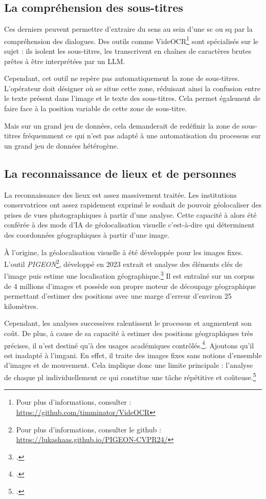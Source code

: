 \subsection{La compréhension des sous-titres}

Ces derniers peuvent permettre d'extraire du sens au sein d'une \gls{sc} ou \gls{sq} par la compréhension des dialogues. Des outils comme VideOCR\footnote{Pour plus d'informations, consulter : \url{https://github.com/timminator/VideOCR}} sont spécialisés sur le sujet : ils isolent les sous-titres, les transcrivent en chaînes de caractères brutes prêtes à être interprétées par un \gls{LLM}.

Cependant, cet outil ne repère pas automatiquement la zone de sous-titres. L'opérateur doit désigner où se situe cette zone, réduisant ainsi la confusion entre le texte présent dans l'image et le texte des sous-titres. Cela permet également de faire face à la position variable de cette zone de sous-titre.

Mais sur un grand jeu de données, cela demanderait de redéfinir la zone de sous-titres fréquemment ce qui n'est pas adapté à une automatisation du processus sur un grand jeu de données hétérogène.

\subsection{La reconnaissance de lieux et de personnes} 

La reconnaissance des lieux est assez massivement traitée. Les institutions conservatrices ont assez rapidement exprimé le souhait de pouvoir géolocaliser des prises de vues photographiques à partir d'une analyse. Cette capacité à alors été conférée à des \glspl{mod} d'\gls{IA} de géolocalisation visuelle c'est-à-dire qui déterminent des coordonnées géographiques à partir d'une image. 

À l'origine, la géolocalisation visuelle à été développée pour les images fixes. L'outil \textit{PIGEON}\footnote{Pour plus d'informations, consulter le github : \url{https://lukashaas.github.io/PIGEON-CVPR24/}}, développé en 2023 extrait et analyse des éléments clés de l'image puis estime une localisation géographique.\footcite{haasPIGEONPredictingImage2023} Il est entraîné sur un corpus de 4 millions d'images et possède son propre moteur de découpage géographique permettant d'estimer des positions avec une marge d'erreur d'environ 25 kilomètres. 

Cependant, les analyses successives ralentissent le processus et augmentent son coût. De plus, à cause de sa capacité à estimer des positions géographiques très précises, il n'est destiné qu'à des usages académiques contrôlés.\footcite[p.11]{haasPIGEONPredictingImage2023}. Ajoutons qu'il est inadapté à l'\gls{imgani}. En effet, il traite des images fixes sans notions d'ensemble d'images et de mouvement. Cela implique donc une limite principale : l'analyse de chaque \gls{pl} individuellement ce qui constitue une tâche répétitive et coûteuse.\footcite[p.1 à 2]{gargSeqNetLearningDescriptors2021}

